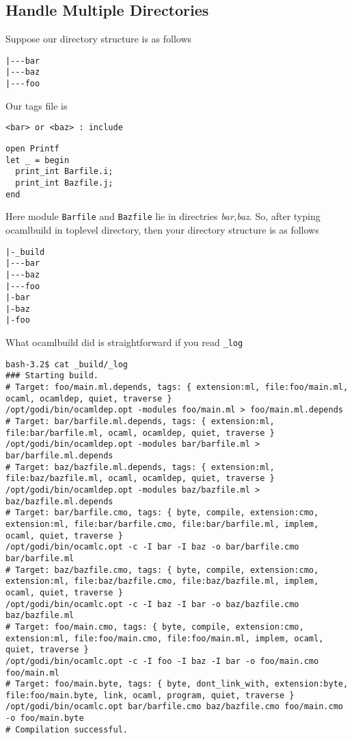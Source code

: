 \documentclass[11pt]{article}
\begin{document}
\subsection*{Handle Multiple Directories}
\label{sec-1-3}

   Suppose our directory structure is as follows 


\begin{verbatim}
|---bar
|---baz
|---foo
\end{verbatim}
   
   Our tags file is 


\begin{verbatim}
<bar> or <baz> : include
\end{verbatim}


\begin{verbatim}
open Printf
let _ = begin
  print_int Barfile.i;
  print_int Bazfile.j;
end
\end{verbatim}

   Here module \texttt{Barfile} and \texttt{Bazfile} lie in directries
   \emph{bar,baz}. So, after typing ocamlbuild in toplevel directory, then
   your directory structure is as follows



\begin{verbatim}
|-_build
|---bar
|---baz
|---foo
|-bar
|-baz
|-foo
\end{verbatim}
   What ocamlbuild did is straightforward if you read \texttt{\_log}



\begin{verbatim}
bash-3.2$ cat _build/_log 
### Starting build.
# Target: foo/main.ml.depends, tags: { extension:ml, file:foo/main.ml, ocaml, ocamldep, quiet, traverse }
/opt/godi/bin/ocamldep.opt -modules foo/main.ml > foo/main.ml.depends
# Target: bar/barfile.ml.depends, tags: { extension:ml, file:bar/barfile.ml, ocaml, ocamldep, quiet, traverse }
/opt/godi/bin/ocamldep.opt -modules bar/barfile.ml > bar/barfile.ml.depends
# Target: baz/bazfile.ml.depends, tags: { extension:ml, file:baz/bazfile.ml, ocaml, ocamldep, quiet, traverse }
/opt/godi/bin/ocamldep.opt -modules baz/bazfile.ml > baz/bazfile.ml.depends
# Target: bar/barfile.cmo, tags: { byte, compile, extension:cmo, extension:ml, file:bar/barfile.cmo, file:bar/barfile.ml, implem, ocaml, quiet, traverse }
/opt/godi/bin/ocamlc.opt -c -I bar -I baz -o bar/barfile.cmo bar/barfile.ml
# Target: baz/bazfile.cmo, tags: { byte, compile, extension:cmo, extension:ml, file:baz/bazfile.cmo, file:baz/bazfile.ml, implem, ocaml, quiet, traverse }
/opt/godi/bin/ocamlc.opt -c -I baz -I bar -o baz/bazfile.cmo baz/bazfile.ml
# Target: foo/main.cmo, tags: { byte, compile, extension:cmo, extension:ml, file:foo/main.cmo, file:foo/main.ml, implem, ocaml, quiet, traverse }
/opt/godi/bin/ocamlc.opt -c -I foo -I baz -I bar -o foo/main.cmo foo/main.ml
# Target: foo/main.byte, tags: { byte, dont_link_with, extension:byte, file:foo/main.byte, link, ocaml, program, quiet, traverse }
/opt/godi/bin/ocamlc.opt bar/barfile.cmo baz/bazfile.cmo foo/main.cmo -o foo/main.byte
# Compilation successful.
\end{verbatim}
\end{document}

